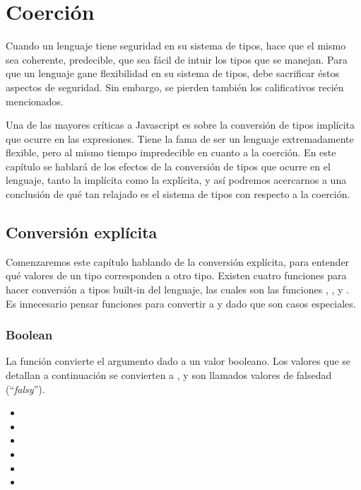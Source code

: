 \chapter{Coerción} %

\label{ch:coercion} %

Cuando un lenguaje tiene seguridad en su sistema de tipos, hace que el mismo sea coherente, predecible, que sea fácil de intuir los tipos que se manejan. Para que un lenguaje gane flexibilidad en su sistema de tipos, debe sacrificar éstos aspectos de seguridad. Sin embargo, se pierden también los calificativos recién mencionados.

Una de las mayores críticas a Javascript es sobre la conversión de tipos implícita que ocurre en las expresiones. Tiene la fama de ser un lenguaje extremadamente flexible, pero al mismo tiempo impredecible en cuanto a la coerción. En este capítulo se hablará de los efectos de la conversión de tipos que ocurre en el lenguaje, tanto la implícita como la explícita, y así podremos acercarnos a una conclusión de qué tan relajado es el sistema de tipos con respecto a la coerción.

\section{Conversión explícita}
\label{sec:conversionexplicita}

Comenzaremos este capítulo hablando de la conversión explícita, para entender qué valores de un tipo corresponden a otro tipo. Existen cuatro funciones para hacer conversión a tipos built-in del lenguaje, las cuales son las funciones , ,  y . Es innecesario pensar funciones para convertir a  y  dado que son casos especiales. 

\subsection{Boolean} 

La función  convierte el argumento dado a un valor booleano. Los valores que se detallan a continuación se convierten a , y son llamados valores de falsedad ("`\textit{falsy}"').

\begin{itemize}
\item {}
\item {}
\item {}
\item {}
\item {}
\item {}
\end{itemize}

